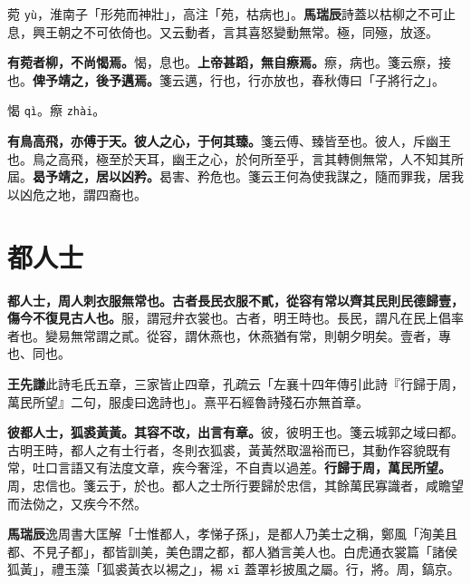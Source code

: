 \begin{quoting}菀 \texttt{yù}，淮南子「形苑而神壯」，高注「苑，枯病也」。\textbf{馬瑞辰}詩蓋以枯柳之不可止息，興王朝之不可依倚也。又云動者，言其喜怒變動無常。極，同殛，放逐。\end{quoting}

\textbf{有菀者柳，不尚愒焉。}{\footnotesize 愒，息也。}\textbf{上帝甚蹈，無自瘵焉。}{\footnotesize 瘵，病也。箋云瘵，接也。}\textbf{俾予靖之，後予邁焉。}{\footnotesize 箋云邁，行也，行亦放也，春秋傳曰「子將行之」。}

\begin{quoting}愒 \texttt{qì}。瘵 \texttt{zhài}。\end{quoting}

\textbf{有鳥高飛，亦傅于天。彼人之心，于何其臻。}{\footnotesize 箋云傅、臻皆至也。彼人，斥幽王也。鳥之高飛，極至於天耳，幽王之心，於何所至乎，言其轉側無常，人不知其所屆。}\textbf{曷予靖之，居以凶矜。}{\footnotesize 曷害、矜危也。箋云王何為使我謀之，隨而罪我，居我以凶危之地，謂四裔也。}

\section{都人士}


\textbf{都人士，周人刺衣服無常也。古者長民衣服不貳，從容有常以齊其民則民德歸壹，傷今不復見古人也。}{\footnotesize 服，謂冠弁衣裳也。古者，明王時也。長民，謂凡在民上倡率者也。變易無常謂之貳。從容，謂休燕也，休燕猶有常，則朝夕明矣。壹者，專也、同也。}

\begin{quoting}\textbf{王先謙}此詩毛氏五章，三家皆止四章，孔疏云「左襄十四年傳引此詩『行歸于周，萬民所望』二句，服虔曰逸詩也」。熹平石經魯詩殘石亦無首章。\end{quoting}

\textbf{彼都人士，狐裘黃黃。其容不改，出言有章。}{\footnotesize 彼，彼明王也。箋云城郭之域曰都。古明王時，都人之有士行者，冬則衣狐裘，黃黃然取溫裕而已，其動作容貌既有常，吐口言語又有法度文章，疾今奢淫，不自責以過差。}\textbf{行歸于周，萬民所望。}{\footnotesize 周，忠信也。箋云于，於也。都人之士所行要歸於忠信，其餘萬民寡識者，咸瞻望而法俲之，又疾今不然。}

\begin{quoting}\textbf{馬瑞辰}逸周書大匡解「士惟都人，孝悌子孫」，是都人乃美士之稱，鄭風「洵美且都、不見子都」，都皆訓美，美色謂之都，都人猶言美人也。白虎通衣裳篇「諸侯狐黃」，禮玉藻「狐裘黃衣以裼之」，裼 \texttt{xī} 蓋罩衫披風之屬。行，將。周，鎬京。\end{quoting}


